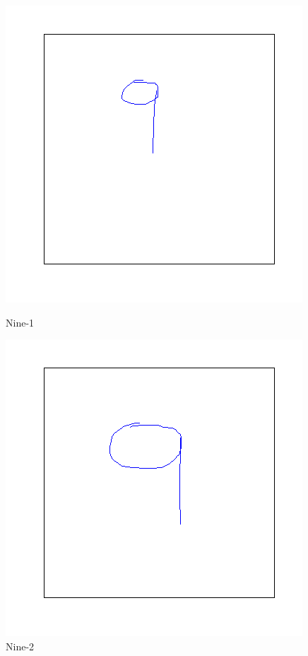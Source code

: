 \documentclass[a4paper, 10pt]{article}
\begin{document}
\begin{figure}[ht]
\begin{minipage}[b]{0.45\linewidth}
\centering
\includegraphics[width=\textwidth]{figs/9-1}
\caption{Nine-1}
\label{fig:figure1}
\end{minipage}
\hspace{0.5cm}
\begin{minipage}[b]{0.45\linewidth}
\centering
\includegraphics[width=\textwidth]{figs/9-2}
\caption{Nine-2}
\label{fig:figure2}
\end{minipage}
\end{figure}
\end{document}
